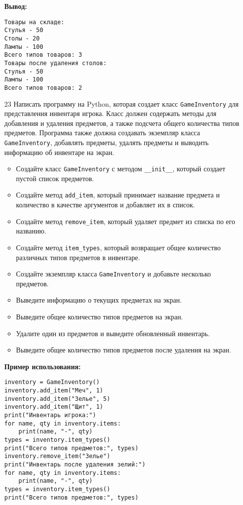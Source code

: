 \begin{enumerate}
\textbf{Вывод:}
\begin{verbatim}
Товары на складе:
Стулья - 50
Столы - 20
Лампы - 100
Всего типов товаров: 3
Товары после удаления столов:
Стулья - 50
Лампы - 100
Всего типов товаров: 2
\end{verbatim}

\item[23] Написать программу на Python, которая создает класс \texttt{GameInventory} для представления инвентаря игрока. Класс должен содержать методы для добавления и удаления предметов, а также подсчета общего количества типов предметов. Программа также должна создавать экземпляр класса \texttt{GameInventory}, добавлять предметы, удалять предметы и выводить информацию об инвентаре на экран.

\begin{itemize}
    \item Создайте класс \texttt{GameInventory} с методом \texttt{\_\_init\_\_}, который создает пустой список предметов.
    \item Создайте метод \texttt{add\_item}, который принимает название предмета и количество в качестве аргументов и добавляет их в список.
    \item Создайте метод \texttt{remove\_item}, который удаляет предмет из списка по его названию.
    \item Создайте метод \texttt{item\_types}, который возвращает общее количество различных типов предметов в инвентаре.
    \item Создайте экземпляр класса \texttt{GameInventory} и добавьте несколько предметов.
    \item Выведите информацию о текущих предметах на экран.
    \item Выведите общее количество типов предметов на экран.
    \item Удалите один из предметов и выведите обновленный инвентарь.
    \item Выведите общее количество типов предметов после удаления на экран.
\end{itemize}

\textbf{Пример использования:}

\begin{verbatim}
inventory = GameInventory()
inventory.add_item("Меч", 1)
inventory.add_item("Зелье", 5)
inventory.add_item("Щит", 1)
print("Инвентарь игрока:")
for name, qty in inventory.items:
    print(name, "-", qty)
types = inventory.item_types()
print("Всего типов предметов:", types)
inventory.remove_item("Зелье")
print("Инвентарь после удаления зелий:")
for name, qty in inventory.items:
    print(name, "-", qty)
types = inventory.item_types()
print("Всего типов предметов:", types)
\end{verbatim}


\end{enumerate}
